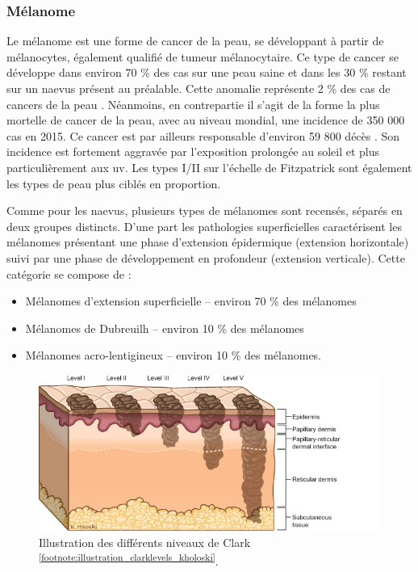 \subsubsection{Mélanome}
Le mélanome est une forme de cancer de la peau, se développant à partir de mélanocytes, également qualifié de tumeur mélanocytaire. Ce type de cancer se développe dans environ 70 \% des cas sur une peau saine et dans les 30 \% restant sur un naevus présent au préalable. Cette anomalie représente 2 \% des cas de cancers de la peau \cite{TortoraG;Derrickson2012}. Néanmoins, en contrepartie il s’agit de la forme la plus mortelle de cancer de la peau, avec au niveau mondial, une incidence de 350 000 cas en 2015. Ce cancer est par ailleurs responsable d’environ 59 800 décès \cite{Karimkhani2017}. Son incidence est fortement aggravée par l’exposition prolongée au soleil et plus particulièrement aux \gls{uv}. Les types I/II sur l’échelle de Fitzpatrick sont également les types de peau plus ciblés en proportion.\par

Comme pour les naevus, plusieurs types de mélanomes sont recensés, séparés en deux groupes distincts. D’une part les pathologies superficielles caractérisent les mélanomes présentant une phase d’extension épidermique (extension horizontale) suivi par une phase de développement en profondeur (extension verticale). Cette catégorie se compose de :
\begin{itemize}
\item Mélanomes d'extension superficielle – environ 70 \% des mélanomes
\item Mélanomes de Dubreuilh – environ 10 \% des mélanomes \cite{LeGal2011}
\item Mélanomes acro-lentigineux – environ 10 \% des mélanomes.
\end{itemize}
\begin{figure}[H]
    \centering
    \includegraphics[width=0.7\linewidth]{contents/chapter_1/resources/illustration_clarklevels_kholoski.png}
    \caption{Illustration des différents niveaux de Clark \cite{Clark1969} \textsuperscript{\ref{footnote:illustration_clarklevels_kholoski}}.}
    \label{fig:illustration_clarklevels_kholoski}
\end{figure}\par

